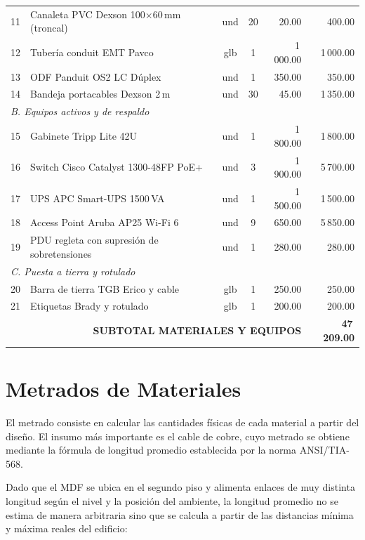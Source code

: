 \begin{table}[H]
\begin{tabular}{clccrr}
11 & Canaleta PVC Dexson 100$\times$60\,mm (troncal)     & und & 20  & 20.00 & 400.00 \\
12 & Tubería conduit EMT Pavco             & glb  & 1   & 1\,000.00 & 1\,000.00 \\
13 & ODF Panduit OS2 LC Dúplex             & und  & 1   & 350.00    & 350.00 \\
14 & Bandeja portacables Dexson 2\,m       & und  & 30  & 45.00     & 1\,350.00 \\
%
\multicolumn{6}{l}{\textit{B. Equipos activos y de respaldo}} \\
%
15 & Gabinete Tripp Lite 42U               & und  & 1   & 1\,800.00 & 1\,800.00 \\
16 & Switch Cisco Catalyst 1300-48FP PoE+  & und  & 3   & 1\,900.00 & 5\,700.00 \\
17 & UPS APC Smart-UPS 1500\,VA            & und  & 1   & 1\,500.00 & 1\,500.00 \\
18 & Access Point Aruba AP25 Wi-Fi 6       & und  & 9   & 650.00    & 5\,850.00 \\
19 & PDU regleta con supresión de sobretensiones & und & 1 & 280.00 & 280.00 \\
%
\multicolumn{6}{l}{\textit{C. Puesta a tierra y rotulado}} \\
%
20 & Barra de tierra TGB Erico y cable     & glb  & 1   & 250.00    & 250.00 \\
21 & Etiquetas Brady y rotulado            & glb  & 1   & 200.00    & 200.00 \\
\hline
\multicolumn{5}{r}{\textbf{SUBTOTAL MATERIALES Y EQUIPOS}} & \textbf{47\,209.00} \\
\hline
\end{tabular}
\end{table}

\section{Metrados de Materiales}
El metrado consiste en calcular las cantidades físicas de cada material a partir del diseño. El insumo más importante es el cable de cobre, cuyo metrado se obtiene mediante la fórmula de longitud promedio establecida por la norma ANSI/TIA-568.

Dado que el MDF se ubica en el segundo piso y alimenta enlaces de muy distinta longitud según el nivel y la posición del ambiente, la longitud promedio no se estima de manera arbitraria sino que se calcula a partir de las distancias mínima y máxima reales del edificio:

